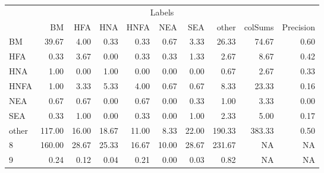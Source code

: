 \begin{table}
\centering\begingroup\fontsize{11}{13}\selectfont

\begin{tabular}{lrrrrrr>{}r|rr}
\toprule
\multicolumn{10}{c}{Labels} \\
\cmidrule(l{3pt}r{3pt}){1-10}
  & BM & HFA & HNA & HNFA & NEA & SEA & other & colSums & Precision\\
\midrule
BM & 39.67 & 4.00 & 0.33 & 0.33 & 0.67 & 3.33 & 26.33 & 74.67 & 0.60\\
HFA & 0.33 & 3.67 & 0.00 & 0.33 & 0.33 & 1.33 & 2.67 & 8.67 & 0.42\\
HNA & 1.00 & 0.00 & 1.00 & 0.00 & 0.00 & 0.00 & 0.67 & 2.67 & 0.33\\
HNFA & 1.00 & 3.33 & 5.33 & 4.00 & 0.67 & 0.67 & 8.33 & 23.33 & 0.16\\
NEA & 0.67 & 0.67 & 0.00 & 0.67 & 0.00 & 0.33 & 1.00 & 3.33 & 0.00\\
\addlinespace
SEA & 0.33 & 1.00 & 0.00 & 0.33 & 0.00 & 1.00 & 2.33 & 5.00 & 0.17\\
other & 117.00 & 16.00 & 18.67 & 11.00 & 8.33 & 22.00 & 190.33 & 383.33 & 0.50\\
8 & 160.00 & 28.67 & 25.33 & 16.67 & 10.00 & 28.67 & 231.67 & NA & NA\\
9 & 0.24 & 0.12 & 0.04 & 0.21 & 0.00 & 0.03 & 0.82 & NA & NA\\
\bottomrule
\end{tabular}
\endgroup{}
\end{table}
